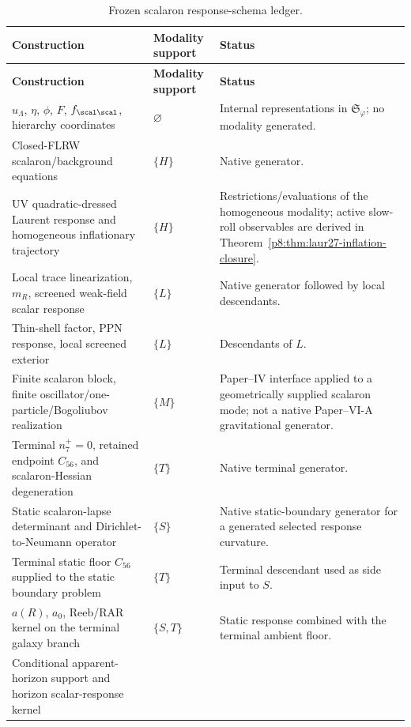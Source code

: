 \documentclass[12pt,a4paper]{article}
\begin{document}
\begin{center}
\begin{xltabular}{0.98\textwidth}{@{}>{\raggedright\arraybackslash}p{0.30\textwidth}>{\raggedright\arraybackslash}p{0.18\textwidth}>{\raggedright\arraybackslash}X@{}}
\caption{Frozen scalaron response-schema ledger.}
\label{p8:tab:scalaron-response-schema-ledger}\\
\toprule
\textbf{Construction} & \textbf{Modality support} & \textbf{Status} \\
\midrule
\endfirsthead
\toprule
\textbf{Construction} & \textbf{Modality support} & \textbf{Status} \\
\midrule
\endhead
$u_{\Lambda}$, $\eta$, $\phi$, $F$, $f_{\scal\scal}$, hierarchy coordinates
& $\varnothing$
& Internal representations in $\mathfrak S_{\varphi}$; no modality generated. \\
Closed-FLRW scalaron/background equations
& $\{H\}$
& Native generator. \\
UV quadratic-dressed Laurent response and homogeneous inflationary trajectory
& $\{H\}$
& Restrictions/evaluations of the homogeneous modality; active slow-roll
  observables are derived in Theorem~\ref{p8:thm:laur27-inflation-closure}. \\
Local trace linearization, $m_R$, screened weak-field scalar response
& $\{L\}$
& Native generator followed by local descendants. \\
Thin-shell factor, PPN response, local screened exterior
& $\{L\}$
& Descendants of $L$. \\
Finite scalaron block, finite oscillator/one-particle/Bogoliubov realization
& $\{M\}$
& Paper--IV interface applied to a geometrically supplied scalaron mode; not a native Paper--VI-A gravitational generator. \\
Terminal \(n_7^+=0\), retained endpoint \(C_{56}\), and scalaron-Hessian degeneration
& $\{T\}$
& Native terminal generator. \\
Static scalaron-lapse determinant and Dirichlet-to-Neumann operator
& $\{S\}$
& Native static-boundary generator for a generated selected response curvature. \\
Terminal static floor $C_{56}$ supplied to the static boundary problem
& $\{T\}$
& Terminal descendant used as side input to $S$. \\
$a(R)$, $a_0$, Reeb/RAR kernel on the terminal galaxy branch
& $\{S,T\}$
& Static response combined with the terminal ambient floor. \\
Conditional apparent-horizon support and horizon scalar-response kernel

\end{xltabular}
\end{center}
\end{document}

